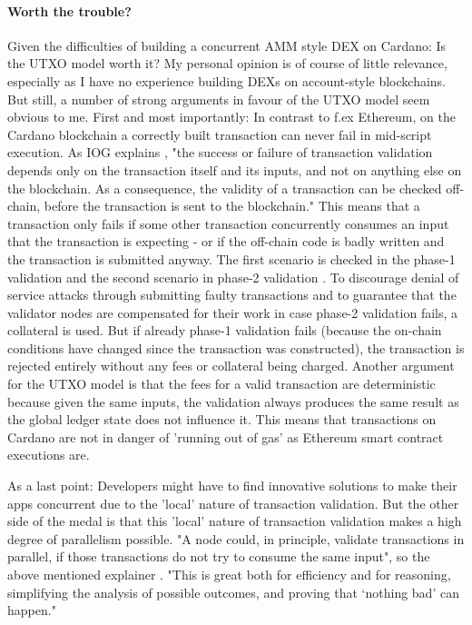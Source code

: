 \documentclass[a4paper,twoside,12pt]{report}
\begin{document}
\paragraph{Worth the trouble?} Given the difficulties of building a concurrent AMM style DEX on Cardano: Is the UTXO model worth it? My personal opinion is of course of little relevance, especially as I have no experience building DEXs on account-style blockchains. But still, a number of strong arguments in favour of the UTXO model seem obvious to me. First and most importantly: In contrast to f.ex Ethereum, on the Cardano blockchain a correctly built transaction can never fail in mid-script execution. As IOG explains \cite{cardanoEUTXOExplainer}, "the success or failure of transaction validation depends only on the transaction itself and its inputs, and not on anything else on the blockchain. As a consequence, the validity of a transaction can be checked off-chain, before the transaction is sent to the blockchain." This means that a transaction only fails if some other transaction concurrently consumes an input that the transaction is expecting - or if the off-chain code is badly written and the transaction is submitted anyway. The first scenario is checked in the phase-1 validation and the second scenario in phase-2 validation \cite{cardanoCollateral}. To discourage denial of service attacks through submitting faulty transactions and to guarantee that the validator nodes are compensated for their work in case phase-2 validation fails, a collateral is used. But if already phase-1 validation fails (because the on-chain conditions have changed since the transaction was constructed), the transaction is rejected entirely without any fees or collateral being charged.
Another argument for the UTXO model is that the fees for a valid transaction are deterministic because given the same inputs, the validation always produces the same result as the global ledger state does not influence it. This means that transactions on Cardano are not in danger of 'running out of gas' as Ethereum smart contract executions are.

As a last point: Developers might have to find innovative solutions to make their apps concurrent due to the 'local' nature of transaction validation. But the other side of the medal is that this 'local' nature of transaction validation makes a high degree of parallelism possible. "A node could, in principle, validate transactions in parallel, if those transactions do not try to consume the same input", so the above mentioned explainer \cite{cardanoEUTXOExplainer}. "This is great both for efficiency and for reasoning, simplifying the analysis of possible outcomes, and proving that ‘nothing bad’ can happen."
\end{document}
